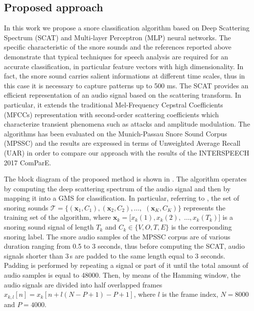 \subsection{Proposed approach}
In this work we propose a snore classification algorithm based on Deep Scattering Spectrum (SCAT) \cite{anden2014deep}  and Multi-layer Perceptron (MLP) neural networks. 
The specific characteristic of the snore sounds and the references reported above demonstrate that typical techniques for speech analysis are required for an accurate classification, in particular feature vectors with high dimensionality. 
In fact, the snore sound carries salient informations at different time scales, thus in this case it is necessary to capture patterns up to 500 ms. The SCAT provides an efficient representation of an audio signal based on the scattering transform. In particular, it extends the traditional Mel-Frequency Cepstral Coefficients (MFCCs) representation  \cite{Davis80-COP}  with second-order scattering coefficients which characterize transient phenomena such as attacks and amplitude modulation.
The algorithms has been evaluated on the Munich-Passau Snore Sound Corpus (MPSSC) \cite{ComParE2017} and the results are expressed in terms of Unweighted Average Recall (UAR) in order to compare our approach with the results of the INTERSPEECH 2017 ComParE.

The block diagram of the proposed method is shown in . The algorithm operates by computing the deep scattering spectrum of the audio signal and then by mapping it into a GMS \cite{Kinnunen2010} for classification. In particular, referring to , the set of snoring sounds  $\mathcal{T}=\{(\mathbf{x}_1, C_1),(\mathbf{x}_2, C_2), \ldots,$ $ (\mathbf{x}_K, C_K)\}$  represents the training set of the algorithm, where $\mathbf{x}_k=[x_k(1), x_k(2),$ $\ldots, x_k(T_k)]$ is a snoring sound signal of length $T_k$ and $C_k \in \{V, O, T, E\}$ is the corresponding snoring label. 
The snore audio samples of the MPSSC corpus are of various duration ranging from 0.5 to 3 seconds, thus before computing the SCAT, audio signals shorter than 3\,s are padded to the same length equal to 3 seconds. Padding is performed by repeating a signal or part of it until the total amount of audio samples is equal to 48000. Then, by means of the Hamming window, the audio signals are divided into half overlapped frames ${x}_{k,l}[n] = {x}_{k}[n + l (N - P + 1) - P + 1]$, where $l$ is the frame index, $N=8000$ and $P=4000$.

